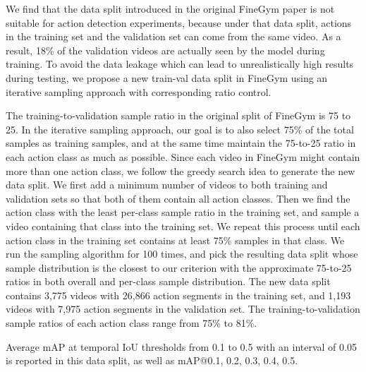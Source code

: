 We find that the data split introduced in the original FineGym paper \cite{shao2020finegym} is not suitable for action detection experiments, because under that data split, actions in the training set and the validation set can come from the same video. As a result, 18\% of the validation videos are actually seen by the model during training. To avoid the data leakage which can lead to unrealistically high results during testing, we propose a new train-val data split in FineGym using an iterative sampling approach with corresponding ratio control.

The training-to-validation sample ratio in the original split of FineGym is 75 to 25. In the iterative sampling approach, our goal is to also select 75\% of the total samples as training samples, and at the same time maintain the 75-to-25 ratio in each action class as much as possible. Since each video in FineGym might contain more than one action class, we follow the greedy search idea to generate the new data split. We first add a minimum number of videos to both training and validation sets so that both of them contain all action classes. 
Then we find the action class with the least per-class sample ratio in the training set, and sample a video containing that class into the training set. 
We repeat this process until each action class in the training set contains at least 75\% samples in that class. We run the sampling algorithm for 100 times, and pick the resulting data split whose sample distribution is the closest to our criterion with the approximate 75-to-25 ratios in both overall and per-class sample distribution. The new data split contains 3,775 videos with 26,866 action segments in the training set, and 1,193 videos with 7,975 action segments in the validation set. The training-to-validation sample ratios of each action class range from 75\% to 81\%.


Average mAP at temporal IoU thresholds from 0.1 to 0.5 with an interval of 0.05 is reported in this data split, as well as mAP@{0.1, 0.2, 0.3, 0.4, 0.5}.















